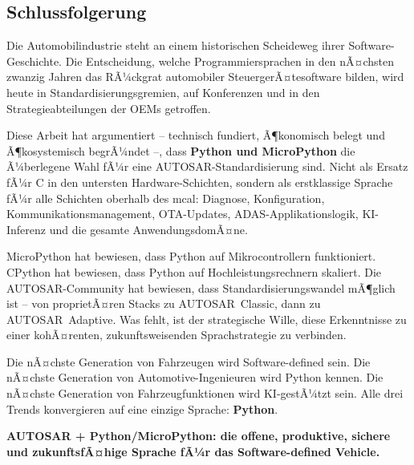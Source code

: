 ﻿\documentclass[12pt,a4paper,twoside]{article}
\begin{document}
\subsection{Schlussfolgerung}
\label{subsec:schluss}

Die Automobilindustrie steht an einem historischen Scheideweg ihrer
Software-Geschichte. Die Entscheidung, welche Programmiersprachen
in den nÃ¤chsten zwanzig Jahren das RÃ¼ckgrat automobiler SteuergerÃ¤tesoftware
bilden, wird heute in Standardisierungsgremien, auf Konferenzen und
in den Strategieabteilungen der OEMs getroffen.

Diese Arbeit hat argumentiert -- technisch fundiert, Ã¶konomisch belegt
und Ã¶kosystemisch begrÃ¼ndet --, dass \textbf{Python und MicroPython}
die Ã¼berlegene Wahl fÃ¼r eine AUTOSAR-Standardisierung sind.
Nicht als Ersatz fÃ¼r C in den untersten Hardware-Schichten, sondern
als erstklassige Sprache fÃ¼r alle Schichten oberhalb des \gls{mcal}:
Diagnose, Konfiguration, Kommunikationsmanagement, OTA-Updates,
ADAS-Applikationslogik, KI-Inferenz und die gesamte AnwendungsdomÃ¤ne.

MicroPython hat bewiesen, dass Python auf Mikrocontrollern funktioniert.
CPython hat bewiesen, dass Python auf Hochleistungsrechnern skaliert.
Die AUTOSAR-Community hat bewiesen, dass Standardisierungswandel mÃ¶glich ist --
von proprietÃ¤ren Stacks zu AUTOSAR~Classic, dann zu AUTOSAR~Adaptive.
Was fehlt, ist der strategische Wille, diese Erkenntnisse zu einer
kohÃ¤renten, zukunftsweisenden Sprachstrategie zu verbinden.

\medskip

Die nÃ¤chste Generation von Fahrzeugen wird Software-defined sein.
Die nÃ¤chste Generation von Automotive-Ingenieuren wird Python kennen.
Die nÃ¤chste Generation von Fahrzeugfunktionen wird KI-gestÃ¼tzt sein.
Alle drei Trends konvergieren auf eine einzige Sprache: \textbf{Python}.

\medskip

\textbf{AUTOSAR + Python/MicroPython: die offene, produktive, sichere
und zukunftsfÃ¤hige Sprache fÃ¼r das Software-defined Vehicle.}
\end{document}
